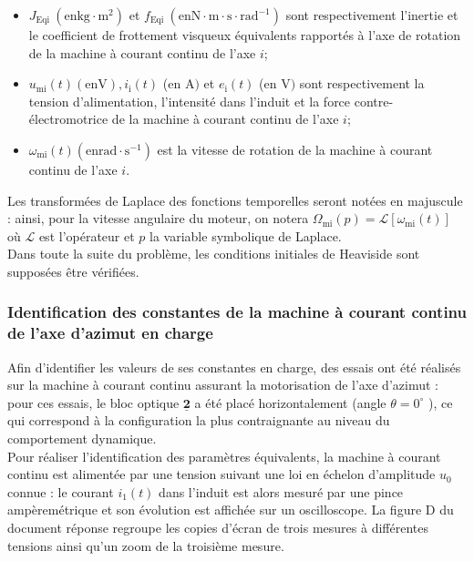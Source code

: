 \begin{itemize}
  \item $J_{\text {Eqi }}\left(\mathrm{en} \mathrm{kg} \cdot \mathrm{m}^{2}\right)$ et $f_{\text {Eqi }}\left(\mathrm{en} \mathrm{N} \cdot \mathrm{m} \cdot \mathrm{s} \cdot \mathrm{rad}^{-1}\right)$ sont respectivement l'inertie et le coefficient de frottement visqueux équivalents rapportés à l'axe de rotation de la machine à courant continu de l'axe $i$;
  \item $u_{\mathrm{mi}}(t)(\mathrm{en} \mathrm{V}), i_{\mathrm{i}}(t)$ (en A$)$ et $e_{\mathrm{i}}(t)$ (en V$)$ sont respectivement la tension d'alimentation, l'intensité dans l'induit et la force contre-électromotrice de la machine à courant continu de l'axe $i$;
  \item $\omega_{\mathrm{mi}}(t)\left(\mathrm{en} \mathrm{rad} \cdot \mathrm{s}^{-1}\right)$ est la vitesse de rotation de la machine à courant continu de l'axe $i$.
\end{itemize}

Les transformées de Laplace des fonctions temporelles seront notées en majuscule : ainsi, pour la vitesse angulaire du moteur, on notera $\Omega_{\mathrm{mi}}(p)=\mathcal{L}\left[\omega_{\mathrm{mi}}(t)\right]$ où $\mathcal{L}$ est l'opérateur et $p$ la variable symbolique de Laplace.\\
Dans toute la suite du problème, les conditions initiales de Heaviside sont supposées être vérifiées.\\
\fi
\ifprof
\begin{corrige}
\end{corrige}
\else
\fi


\subsubsection{Identification des constantes de la machine à courant continu de l'axe d'azimut en charge}
\ifprof
\else
Afin d'identifier les valeurs de ses constantes en charge, des essais ont été réalisés sur la machine à courant continu assurant la motorisation de l'axe d'azimut : pour ces essais, le bloc optique $\underline{\mathbf{2}}$ a été placé horizontalement (angle $\theta=0^{\circ}$ ), ce qui correspond à la configuration la plus contraignante au niveau du comportement dynamique.\\
Pour réaliser l'identification des paramètres équivalents, la machine à courant continu est alimentée par une tension suivant une loi en échelon d'amplitude $u_{0}$ connue : le courant $i_{1}(t)$ dans l'induit est alors mesuré par une pince ampèremétrique et son évolution est affichée sur un oscilloscope. La figure D du document réponse regroupe les copies d'écran de trois mesures à différentes tensions ainsi qu'un zoom de la troisième mesure.\\
\fi

